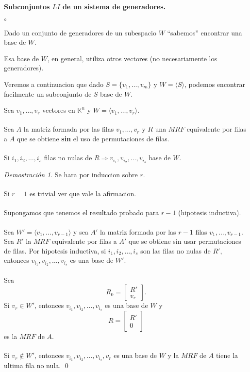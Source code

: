 \documentclass{article}
\theoremstyle{definition}
\theoremstyle{definition}
\theoremstyle{remark}
\newtheorem*{demo}{Demostración}
\begin{document}
\pagebreak
\begin{center}
\textbf{Subconjuntos $LI$ de un sistema de generadores.}
\end{center}
\begin{list}{$\circ$}{}  
\item Dado un conjunto de generadores de un subespacio $W$ ``sabemos'' encontrar una base de $W$.
\item Esa base de $W$, en general, utiliza otros vectores (no necesariamente los generadores).
\item Veremos a continuacion que dado $S=\{v_1, \dots ,v_m\}$ y $W=\langle S \rangle $, podemos encontrar facilmente un subconjunto de $S$ base de $W$.
\end{list}
\begin{teo}
  Sea $v_1, \dots ,v_r$ vectores en $\mathbb{K}^n$ y $W=\langle v_1, \dots ,v_r \rangle $. \\\\ Sea $A$ la matriz formada por las filas $v_1, \dots ,v_r$ y $R$ una $MRF$ equivalente por filas a $A$ que se obtiene \textbf{sin} el uso de permutaciones de filas. \\\\ Si $i_1, i_2 , \dots ,i_s$ filas no nulas de $R \Rightarrow v_{i_1},v_{i_{2}},\dots ,v_{i_{s}}$ base de $W$.
\end{teo}
\begin{demo}
  Se hara por induccion sobre $r$. \\\\ Si $r=1$ es trivial ver que vale la afirmacion. \\\\ Supongamos que tenemos el resultado probado para $r-1$ (hipotesis inductiva).\\\\ Sea $W'=\langle v_1, \dots ,v_{r-1} \rangle $ y sea $A'$ la matriz formada por las $r-1$ filas $v_1, \dots ,v_{r-1}$. Sea $R'$ la $MRF$ equivalente por filas a $A'$ que se obtiene sin usar permutaciones de filas. Por hipotesis inductiva, si $i_1, i_2, \dots, i_s$ son las filas no nulas de $R'$, entonces $v_{i_1},v_{i_{2}}, \dots ,v_{i_{s}}$ es una base de $W'$. \\\\ Sea \[
    R_0=\begin{bmatrix}R' \\ v_r \end{bmatrix}. 
  \]
  Si $v_r \in W'$, entonces $v_{i_{1}}, v_{i_{2}}, \dots ,v_{i_{s}}$ es una base de $W$ y \[
    R=\begin{bmatrix} R' \\ 0 \end{bmatrix}
  \]
  es la $MRF$ de $A$. \\\\ Si $v_r \notin W'$, entonces $v_{i_{1}}, v_{i_{2}}, \dots ,v_{i_{s}},v_r$ es una base de $W$ y la $MRF$ de $A$ tiene la ultima fila no nula. \qed
\end{demo}
\pagebreak
\end{document}
